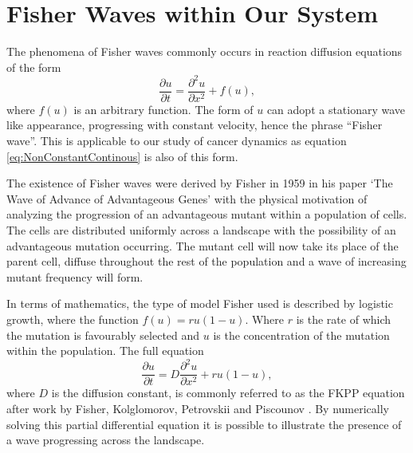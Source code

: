 \documentclass[12pt, a4paper,]{article}
\let\cite=\supercite
\begin{document}




\newpage
\section{Fisher Waves within Our System}
The phenomena of Fisher waves commonly occurs in reaction diffusion equations of the form 
\begin{equation}
\frac{\partial u}{\partial t} = \frac{\partial ^2 u}{\partial x^2} + f(u), 
\end{equation}
where $f(u)$ is an arbitrary function. The form of $u$ can adopt a stationary wave like appearance, progressing with constant velocity, hence the phrase ``Fisher wave''. This is applicable to our study of cancer dynamics as equation \eqref{eq:NonConstantContinous} is also of this form. 

The existence of Fisher waves were derived by Fisher in 1959 in his paper `The Wave of Advance of Advantageous Genes' \cite{fisher_wave_1937} with the physical motivation of analyzing the progression of an advantageous mutant within a population of cells. The cells are distributed uniformly across a landscape with the possibility of an advantageous mutation occurring. The mutant cell will now take its place of the parent cell, diffuse throughout the rest of the population and a wave of increasing mutant frequency will form. 

In terms of mathematics, the type of model Fisher used is described by logistic growth, where the function $f(u) = ru(1-u)$. Where $r$ is the rate of which the mutation is favourably selected and $u$ is the concentration of the mutation within the population. The full equation 
\begin{equation}
\frac{\partial u}{\partial t} = D \frac{\partial ^2 u}{\partial x^2} + ru(1-u), 
\label{eq:FKKPEq}
\end{equation}
where $D$ is the diffusion constant, is commonly referred to as the FKPP equation after work by Fisher, Kolglomorov, Petrovskii and Piscounov \cite{kolmogorov_selected_1991}. By numerically solving this partial differential equation it is possible to illustrate the presence of a wave progressing across the landscape. 
\end{document}
